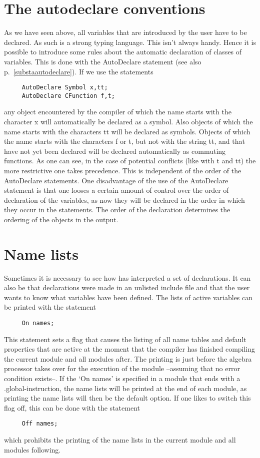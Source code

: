 \section{The autodeclare conventions}

As we have seen above, all variables that are introduced by the user have 
to be declared. As such {\FORM} is a strong typing 
language. This isn't always handy. Hence it is possible to introduce some 
rules about the automatic declaration of classes of variables. This is done 
with the AutoDeclare statement (see also 
p.~\ref{substaautodeclare}). If we use the statements
\begin{verbatim}
     AutoDeclare Symbol x,tt;
     AutoDeclare CFunction f,t;
\end{verbatim}
any object encountered by the compiler of which the name starts with the 
character x will automatically be declared as a symbol. Also objects of 
which the name starts with the characters tt will be declared as symbols. 
Objects of which the name starts with the characters f or t, but not with 
the string tt, and that have not yet been declared will be declared 
automatically as commuting functions. As one can see, in the case of 
potential conflicts (like with t and tt) the more 
restrictive one takes precedence. This is independent of the order of the 
AutoDeclare statements. One disadvantage of the use of the AutoDeclare 
statement is that one looses a certain amount of control over the order of 
declaration of the variables, as now they will be declared in the order in 
which they occur in the statements. The order of the declaration determines 
the ordering of the objects in the output.

\section{Name lists}

\label{sect-namelists}
Sometimes it is necessary to see how {\FORM} has interpreted a set
of declarations. It can also be that declarations were made in an unlisted 
include file and that the user wants to know what variables have been 
defined. The lists of active variables 
can be printed with the statement
\begin{verbatim}
     On names;
\end{verbatim}
This statement sets a flag that causes the listing of all name tables and 
default properties that are active at the moment that the compiler has 
finished compiling the current module and all modules after. The printing 
is just before the algebra processor takes over for the execution of the 
module --assuming that no error condition exists--. If the `On names' is 
specified in a module that ends with a .global-instruction, the name lists 
will be printed at the end of each module, as printing the name lists will 
then be the default option. If one likes to switch this flag off, this can 
be done with the statement
\begin{verbatim}
     Off names;
\end{verbatim}
which prohibits the printing of the name lists in the current module and 
all modules following.

